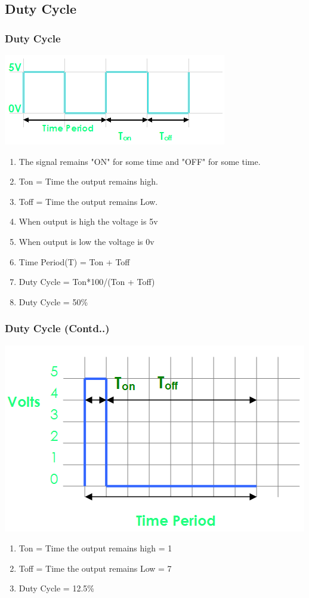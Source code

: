 \documentclass[10pt,red]{beamer}
\begin{document}
\subsection{Duty Cycle}
\begin{frame}[shrink = 2]
	\frametitle{Duty Cycle} \pause
		\includegraphics[width = \linewidth]{50_dutycycle} \pause
			\begin{enumerate}[$\checkmark$]
				\item<+-|alert@+> The signal remains "ON" for some time and  "OFF" for some time.
			 	\item<+-|alert@+> Ton = Time the output remains high.
			 	\item<+-|alert@+> Toff = Time the output remains Low.
			 	\item<+-|alert@+> When output is high the voltage is 5v
			 	\item<+-|alert@+> When output is low the voltage is 0v  
			 	\item<+-|alert@+> Time Period(T) = Ton + Toff
			 	\item<+-|alert@+> Duty Cycle = Ton*100/(Ton + Toff)
			  \item<+-|alert@+> Duty Cycle = 50\%
			\end{enumerate}
\end{frame}

\begin{frame}[shrink = 2]
	\frametitle{Duty Cycle (Contd..)} \pause
		\includegraphics[width = \linewidth]{12_dutycycle} \pause
			\begin{enumerate}[$\checkmark$]
				\item<+-|alert@+> Ton = Time the output remains high = 1
			 	\item<+-|alert@+> Toff = Time the output remains Low = 7
			 	\item<+-|alert@+> Duty Cycle = 12.5\%
			\end{enumerate}
\end{frame}
\end{document}
